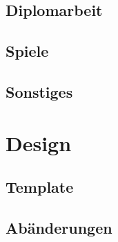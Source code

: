     \subsection{Diplomarbeit}
    \subsection{Spiele}
    \subsection{Sonstiges}
\section{Design}
    \subsection{Template}
    \subsection{Abänderungen}